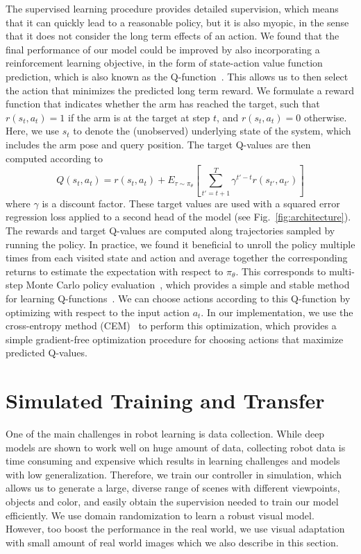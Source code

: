 \documentclass[10pt,twocolumn,letterpaper]{article}
\begin{document}
The supervised learning procedure provides detailed supervision, which means that it can quickly lead to a reasonable policy, but it is also myopic, in the sense that it does not consider the long term effects of an action. We found that the final performance of our model could be improved by also incorporating a reinforcement learning objective, in the form of state-action value function prediction, which is also known as the Q-function~\cite{sutton1998reinforcement}. This allows us to then select the action that minimizes the predicted long term reward. We formulate a reward function that indicates whether the arm has reached the target, such that $r(s_t,a_t) = 1$ if the arm is at the target at step $t$, and $r(s_t,a_t) = 0$ otherwise. Here, we use $s_t$ to denote the (unobserved) underlying state of the system, which includes the arm pose and query position. The target Q-values are then computed according to
\[
Q(s_t,a_t) = r(s_t,a_t) + E_{\tau \sim \pi_\theta}\left[ \sum_{t'={t+1}}^T \gamma^{t'-t} r(s_{t'},a_{t'}) \right]
\]
where $\gamma$ is a discount factor. These target values are used with a squared error regression loss applied to a second head of the model (see Fig.~\ref{fig:architecture}). The rewards and target Q-values are computed along trajectories sampled by running the policy. In practice, we found it beneficial to unroll the policy multiple times from each visited state and action and average together the corresponding returns to estimate the expectation with respect to $\pi_\theta$. This corresponds to multi-step Monte Carlo policy evaluation~\cite{sutton1998reinforcement}, which provides a simple and stable method for learning Q-functions~\cite{sadeghi2017cadrl}.
We can choose actions according to this Q-function by optimizing with respect to the input action $a_t$. In our implementation, we use the cross-entropy method (CEM)~\cite{rubinstein1999cross} to perform this optimization, which provides a simple gradient-free optimization procedure for choosing actions that maximize predicted Q-values.

\section{Simulated Training and Transfer}\label{sec:sim_real}
One of the main challenges in robot learning is data collection. While deep models are shown to work well on huge amount of data, collecting robot data is time consuming and expensive which results in learning challenges and models with low generalization. Therefore, we train our controller in simulation, which allows us to generate a large, diverse range of scenes with different viewpoints, objects and color, and easily obtain the supervision needed to train our model efficiently. We use domain randomization to learn a robust visual model. However, too boost the performance in the real world, we use visual adaptation with small amount of real world images which we also describe in this section.
\end{document}
